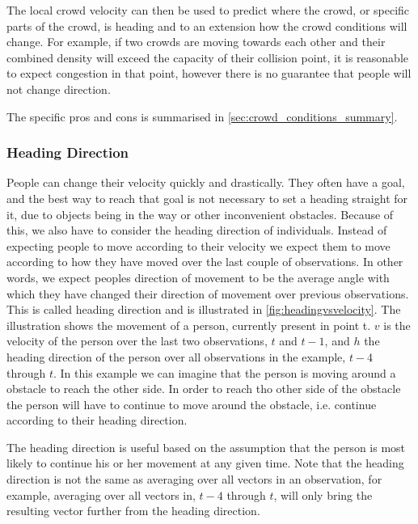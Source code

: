 The local crowd velocity can then be used to predict where the crowd, or specific parts of the crowd, is heading and to an extension how the crowd conditions will change. For example, if two crowds are moving towards each other and their combined density will exceed the capacity of their collision point, it is reasonable to expect congestion in that point, however there is no guarantee that people will not change direction. 


The specific pros and cons is summarised in \cref{sec:crowd_conditions_summary}.

\subsubsection{Heading Direction}\label{subsubsec:headingDirection}
People can change their velocity quickly and drastically. They often have a goal, and the best way to reach that goal is not necessary to set a heading straight for it, due to objects being in the way or other inconvenient obstacles. Because of this, we also have to consider the heading direction of individuals. Instead of expecting people to move according to their velocity we expect them to move according to how they have moved over the last couple of observations. In other words, we expect peoples direction of movement to be the average angle with which they have changed their direction of movement over previous observations. This is called heading direction and is illustrated in \cref{fig:headingvsvelocity}. The illustration shows the movement of a person, currently present in point t. $v$ is the velocity of the person over the last two observations, $t$ and $t-1$, and $h$ the heading direction of the person over all observations in the example, $t-4$ through $t$. In this example we can imagine that the person is moving around a obstacle to reach the other side. In order to reach tho other side of the obstacle the person will have to continue to move around the obstacle, i.e. continue according to their heading direction.

The heading direction is useful based on the assumption that the person is most likely to continue his or her movement at any given time. Note that the heading direction is not the same as averaging over all vectors in an observation, for example, averaging over all vectors in, $t-4$ through $t$, will only bring the resulting vector further from the heading direction.

